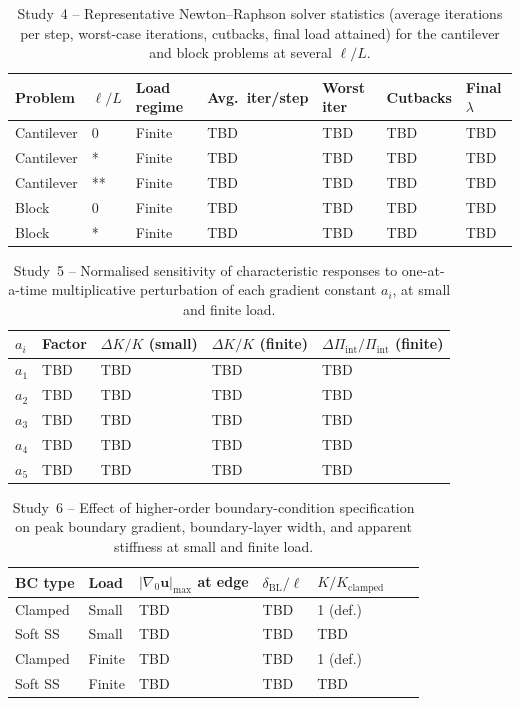 \documentclass[11pt]{article}
\newcommand{\gradz}{\nabla_{0}}
\newcommand{\gradz}{\nabla_{0}}
\begin{document}
\begin{table}[h]
\centering
\caption{Study~4 -- Representative Newton--Raphson solver
  statistics (average iterations per step, worst-case
  iterations, cutbacks, final load attained) for the
  cantilever and block problems at several $\ell/L$.}
\label{tab:s9_newton_stats}
\begin{tabular}{lllllll}
\toprule
Problem & $\ell/L$ & Load regime
  & Avg.\ iter/step & Worst iter & Cutbacks & Final $\lambda$ \\
\midrule
Cantilever & 0 & Finite & TBD & TBD & TBD & TBD \\
Cantilever & * & Finite & TBD & TBD & TBD & TBD \\
Cantilever & ** & Finite & TBD & TBD & TBD & TBD \\
Block & 0 & Finite & TBD & TBD & TBD & TBD \\
Block & * & Finite & TBD & TBD & TBD & TBD \\
\bottomrule
\end{tabular}
\end{table}

\begin{table}[h]
\centering
\caption{Study~5 -- Normalised sensitivity of characteristic
  responses to one-at-a-time multiplicative perturbation of
  each gradient constant $a_i$, at small and finite load.}
\label{tab:s9_sensitivity}
\begin{tabular}{lllll}
\toprule
$a_i$ & Factor
  & $\Delta K/K$ (small)
  & $\Delta K/K$ (finite)
  & $\Delta\Pi_{\mathrm{int}}/\Pi_{\mathrm{int}}$ (finite) \\
\midrule
$a_1$ & TBD & TBD & TBD & TBD \\
$a_2$ & TBD & TBD & TBD & TBD \\
$a_3$ & TBD & TBD & TBD & TBD \\
$a_4$ & TBD & TBD & TBD & TBD \\
$a_5$ & TBD & TBD & TBD & TBD \\
\bottomrule
\end{tabular}
\end{table}

\begin{table}[h]
\centering
\caption{Study~6 -- Effect of higher-order boundary-condition
  specification on peak boundary gradient, boundary-layer
  width, and apparent stiffness at small and finite load.}
\label{tab:s9_bc}
\begin{tabular}{lllllll}
\toprule
BC type & Load
  & $|\gradz\mathbf{u}|_{\max}$ at edge
  & $\delta_{\mathrm{BL}}/\ell$
  & $K/K_{\mathrm{clamped}}$ \\
\midrule
Clamped  & Small & TBD & TBD & 1 (def.) \\
Soft SS  & Small & TBD & TBD & TBD \\
Clamped  & Finite & TBD & TBD & 1 (def.) \\
Soft SS  & Finite & TBD & TBD & TBD \\
\bottomrule
\end{tabular}
\end{table}
\end{document}
